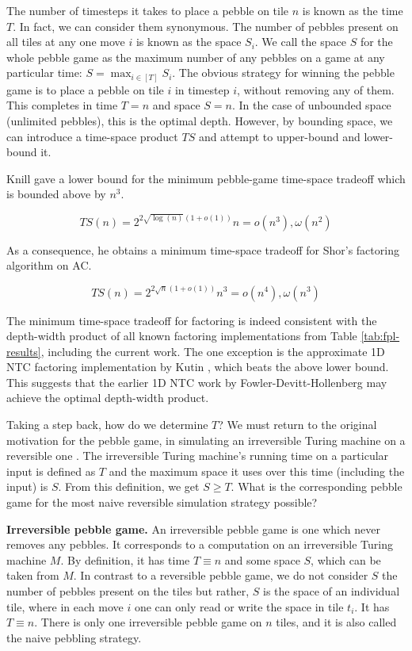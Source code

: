 The number of timesteps it takes to place a pebble on tile $n$ is known
as the time $T$. In fact, we can consider them synonymous.
The number of pebbles present on all tiles at any one move $i$
is known as the space $S_i$. We call the space $S$ for the whole pebble
game as the maximum number of any pebbles on a game at any particular time:
$S = \max_{i \in [T]} S_i$.
The obvious strategy for winning the pebble game is
to place a pebble on tile $i$ in timestep $i$, without removing any of them.
This completes in time $T=n$ and space $S = n$. In the case of unbounded
space (unlimited pebbles), this is the optimal depth. However, by
bounding space, we can introduce a time-space product $TS$ and attempt to
upper-bound and lower-bound it.

Knill gave a lower bound for the minimum pebble-game time-space tradeoff
\cite{Knill1995} which is bounded above by $n^3$.

\begin{equation}
TS(n) = 2^{2\sqrt{\log(n)}(1 + o(1))}n = o(n^3), \omega(n^2)
\end{equation}

As a consequence, he obtains a minimum time-space tradeoff for
Shor's factoring algorithm on \textsf{AC}.

\begin{equation}
TS(n) = 2^{2\sqrt{n}(1 + o(1))}n^3 = o(n^4), \omega(n^3)
\end{equation}

The minimum time-space tradeoff for factoring is indeed consistent with the depth-width product of all known
factoring implementations from Table \ref{tab:fpl-results}, including
the current work. The one exception is the approximate 1D NTC factoring
implementation by Kutin \cite{Kutin2006}, which beats the above lower bound.
This suggests that the earlier 1D NTC work by Fowler-Devitt-Hollenberg
\cite{Fowler2004} may achieve the optimal depth-width product.

Taking a step back, how do we determine $T$? We must return to the original
motivation for the pebble game, in simulating an irreversible Turing machine
on a reversible one \cite{Bennett1989}. The irreversible Turing machine's
running time on a particular input is defined as $T$ and the maximum
space it uses over this time (including the input) is $S$. From this definition,
we get $S \ge T$. What is the corresponding pebble game for the most naive
reversible simulation strategy possible?

\begin{definition}{\textbf{Irreversible pebble game.}}
An irreversible pebble game is one which never removes any pebbles.
It corresponds to a computation on an irreversible Turing machine $M$.
By definition, it has time $T \equiv n$ and some space $S$, which can
be taken from $M$. In contrast to a reversible pebble game, we do not
consider $S$ the number of pebbles present on the tiles but rather, $S$
is the space of an individual tile, where in each move $i$ one can only
read or write the space in tile $t_i$.
It has $T \equiv n$.
There is only one irreversible pebble game on $n$ tiles, and it is also called
the naive pebbling strategy.
\end{definition}

